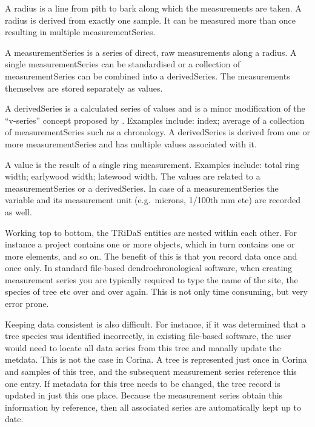\begin{description*}
\item[A radius] is a line from pith to bark along which the measurements are taken. A radius is derived from exactly one sample. It can be measured more than once resulting in multiple measurementSeries.

\item[A measurementSeries] is a series of direct, raw measurements along a radius. A single measurementSeries can be standardised or a collection of measurementSeries can be combined into a derivedSeries.  The measurements themselves are stored separately as values.

\item[A derivedSeries] is a calculated series of values and is a minor modification of the ``v-series'' concept proposed by \cite{corina}.  Examples include: index; average of a collection of measurementSeries such as a chronology. A derivedSeries is derived from one or more measurementSeries and has multiple values associated with it.

\item[A value] is the result of a single ring measurement. Examples include: total ring width; earlywood width; latewood width. The values are related to a measurementSeries or a derivedSeries. In case of a measurementSeries the variable and its measurement unit (e.g.\ microns, 1/100th mm etc) are recorded as well.

\end{description*}


Working top to bottom, the TRiDaS entities are nested within each other.  For instance a project contains one or more objects, which in turn contains one or more elements, and so on.  The benefit of this is that you record data once and once only.  In standard file-based dendrochronological software, when creating measurement series you are typically required to type the name of the site, the species of tree etc over and over again.  This is not only time consuming, but very error prone.  

Keeping data consistent is also difficult.  For instance, if it was determined that a tree species was identified incorrectly, in existing file-based software, the user would need to locate all data series from this tree and manally update the metdata.  This is not the case in Corina.  A tree is represented just once in Corina and samples of this tree, and the subsequent measurement series reference this one entry.  If metadata for this tree needs to be changed, the tree record is updated in just this one place.  Because the measurement series obtain this information by reference, then all associated series are automatically kept up to date.

